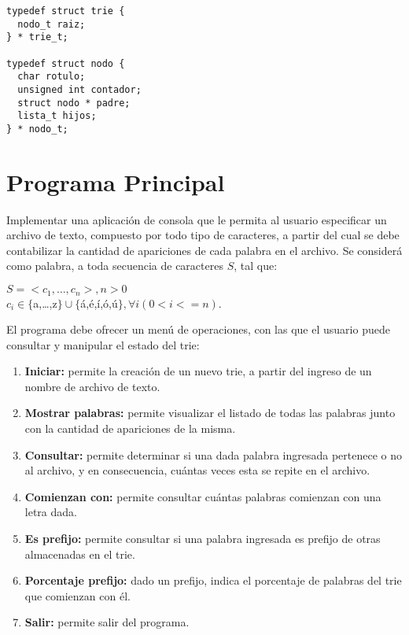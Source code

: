 \documentclass[12pt,a4paper]{article}
\begin{document}
\begin{verbatim}
typedef struct trie {
  nodo_t raiz;
} * trie_t;

typedef struct nodo {
  char rotulo;
  unsigned int contador;
  struct nodo * padre;
  lista_t hijos;
} * nodo_t;

\end{verbatim}

\section{Programa Principal}
Implementar una aplicación de consola que le permita al usuario especificar un archivo de texto, compuesto por todo tipo de caracteres, a partir del cual se debe contabilizar la cantidad de apariciones de cada palabra en el archivo. Se considerá como palabra, a toda secuencia de caracteres $S$, tal que:
\begin{center}
$S=<c_1,\dots,c_n>, n>0$\\
$c_i \in \{$a,\dots,z$\} \cup \{$á,é,í,ó,ú$\}, \forall{i} (0<i<=n)$.
\end{center}

El programa debe ofrecer un menú de operaciones, con las que el usuario puede consultar y manipular el estado del trie:
\begin{enumerate}	
	\item \textbf{Iniciar:} permite la creación de un nuevo trie, a partir del ingreso de un nombre de archivo de texto.
	
	\item \textbf{Mostrar palabras:} permite visualizar el listado de todas las palabras junto con la cantidad de apariciones de la misma.
	
	\item \textbf{Consultar:} permite determinar si una dada palabra ingresada pertenece o no al archivo, y en consecuencia, cuántas veces esta se repite en el archivo.
	
	\item \textbf{Comienzan con:} permite consultar cuántas palabras comienzan con una letra dada.
	
	\item \textbf{Es prefijo:} permite consultar si una palabra ingresada es prefijo de otras almacenadas en el trie.

	\item \textbf{Porcentaje prefijo:} dado un prefijo, indica el porcentaje de palabras del trie que comienzan con él. 
	
	\item \textbf{Salir:} permite salir del programa.
\end{enumerate}
	
\end{document}
